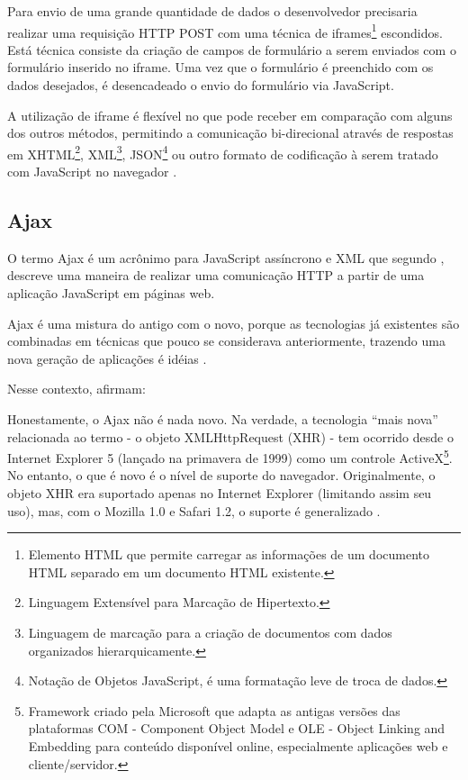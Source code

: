 Para envio de uma grande quantidade de dados o desenvolvedor precisaria realizar uma requisição HTTP POST com uma técnica de iframes\footnote{Elemento HTML que permite carregar as informações de um documento HTML separado em um documento HTML existente.} escondidos. Está técnica consiste da criação de campos de formulário a serem enviados com o formulário inserido no iframe. Uma vez que o formulário é preenchido com os dados desejados, é desencadeado o envio do formulário via JavaScript.

A utilização de iframe é flexível no que pode receber em comparação com alguns dos outros métodos, permitindo a comunicação bi-direcional através de respostas em XHTML\footnote{Linguagem Extensível para Marcação de Hipertexto.}, XML\footnote{Linguagem de marcação para a criação de documentos com dados organizados hierarquicamente.}, JSON\footnote{Notação de Objetos JavaScript, é uma formatação leve de troca de dados.} ou outro formato de codificação à serem tratado com JavaScript no navegador \cite{powell2008ajax}.

\subsection{Ajax}

O termo Ajax é um acrônimo para JavaScript assíncrono e XML que segundo , descreve uma maneira de realizar uma comunicação HTTP a partir de uma aplicação JavaScript em páginas web.

Ajax é uma mistura do antigo com o novo, porque as tecnologias já existentes são combinadas em técnicas que pouco se considerava anteriormente, trazendo uma nova geração de aplicações é idéias \cite{gross2006introduction}.

Nesse contexto,  afirmam:
\begin{citacao}
	Honestamente, o Ajax não é nada novo. Na verdade, a tecnologia “mais nova” relacionada ao termo - o objeto XMLHttpRequest (XHR) - tem ocorrido desde o Internet Explorer 5 (lançado na primavera de 1999) como um controle ActiveX\footnote{Framework criado pela Microsoft que adapta as antigas versões das plataformas COM - Component Object Model e OLE - Object Linking and Embedding para conteúdo disponível online, especialmente aplicações web e cliente/servidor.}. No entanto, o que é novo é o nível de suporte do navegador. Originalmente, o objeto XHR era suportado apenas no Internet Explorer (limitando assim seu uso), mas, com o Mozilla 1.0 e Safari 1.2, o suporte é generalizado \cite[P.~13]{Asleson2006}.
\end{citacao}

